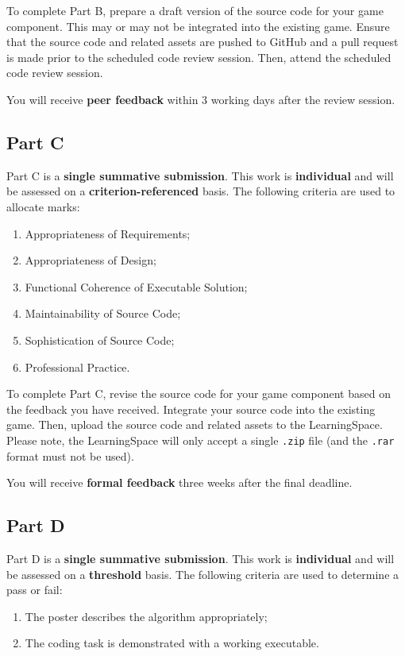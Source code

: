 \documentclass{../fal_assignment}
\begin{document}
To complete Part B, prepare a draft version of the source code for your game component. This may or may not be integrated into the existing game. Ensure that the source code and related assets are pushed to GitHub and a pull request is made prior to the scheduled code review session. Then, attend the scheduled code review session.

You will receive \textbf{peer feedback} within 3 working days after the review session.

\subsection*{Part C}

Part C is a \textbf{single summative submission}. This work is \textbf{individual} and will be assessed on a \textbf{criterion-referenced} basis. The following criteria are used to allocate marks:

\begin{enumerate}[label=(\alph*)]
	\item Appropriateness of Requirements;
	\item Appropriateness of Design;
	\item Functional Coherence of Executable Solution;
	\item Maintainability of Source Code;
	\item Sophistication of Source Code;
	\item Professional Practice.
\end{enumerate}

To complete Part C, revise the source code for your game component based on the feedback you have received. Integrate your source code into the existing game. Then, upload the source code and related assets to the LearningSpace. Please note, the LearningSpace will only accept a single \texttt{.zip} file (and the \texttt{.rar} format must not be used).

You will receive \textbf{formal feedback} three weeks after the final deadline.

\subsection*{Part D}

Part D is a \textbf{single summative submission}. This work is \textbf{individual} and will be assessed on a \textbf{threshold} basis. The following criteria are used to determine a pass or fail:

\begin{enumerate}[label=(\alph*)]
	\item The poster describes the algorithm appropriately;
	\item The coding task is demonstrated with a working executable.
\end{enumerate}
\end{document}
